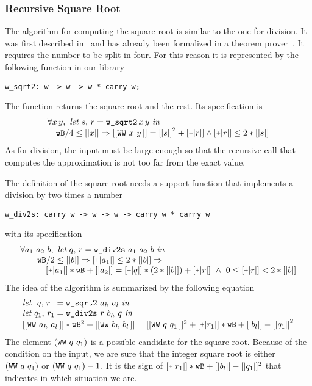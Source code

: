 \subsubsection{Recursive Square Root}

The algorithm for computing the square root is similar to the one for division.
It was first described in~\cite{RecSqrt} and has already been formalized in a 
theorem prover~\cite{BerMagZim02}. It requires the number to be split
in four. For this reason it is represented by the following function in our
library
\begin{verbatim}
w_sqrt2: w -> w -> w * carry w;
\end{verbatim}
The function returns the square root and the rest.
Its specification is
$$\begin{array}{l}
\forall x\, y,\,\, \textit{let}\,\, s,\, r = \texttt{w\_sqrt2}\, x\, y\,\, \textit{in}\\
\hskip10pt \wB / 4 \le [|x|] \Rightarrow [[\WW x y]] = {[|s|]} ^ 2 + \ICP{r} \land \ICP{r} \le 2 * [|s|]
\end{array}
$$
As for division, the input must be large enough so that the recursive call
that computes the approximation is not too far from the exact value. 

The definition of the square root needs a support function that implements a division
by two times a number
\begin{verbatim}
w_div2s: carry w -> w -> w -> carry w * carry w
\end{verbatim}
with its specification
$$\begin{array}{l}
\forall a_1\,\, a_2\,\, b, \,\, \textit{let}\,\, q,\, r = \texttt{w\_div2s}\,\, a_1\,\, a_2\,\, b\,\, \textit{in}\\
\hskip20pt \wB / 2 \le [|b|] \Rightarrow \ICP{a_1} \le 2 * [|b|] \Rightarrow\\
\hskip30pt \ICP{a_1} * \wB + [|a_2|] = \ICP{q} *  (2 * [|b|]) + \ICP{r} \,\, \land\,\, 0 \le \ICP{r} < 2 * [|b|]
\end{array}
$$
The idea of the algorithm is summarized by the following equation
$$\begin{array}{l}
\textit{let}\,\,\,\, q ,\, r\,\,\, = \texttt{w\_sqrt2}\,\, {a_h}\,\, {a_l}\,\, \textit{in}\\
\textit{let}\,\, q_1 ,\, r_1 = \texttt{w\_div2s}\,\, r\,\, {b_h}\,\, q\,\, \textit{in}\\
{[[\WW {a_h} {a_l}]]} * \wB ^ 2 + [[\WW {b_h} {b_l}]] =
    [[\WW q {q_1}]] ^ 2 + \ICP{r_1} * \wB + [|{b_l}|] - {[|q_1|]} ^ 2 \\
\end{array}
$$
The element $(\texttt{WW}\,\,q\,\,q_1\,\!)$ is a possible candidate
for the square root. Because of the condition on
the input, we are sure that the integer square root is either 
$(\texttt{WW}\,\,q\,\,q_1\,\!)$ or
$(\texttt{WW}\,\,q\,\,q_1\,\!) - 1$. It is the sign of $\ICP{r_1} * \wB + 
[|{b_l}|] - [|q_1|] ^ 2$ that indicates in which situation we are. 
